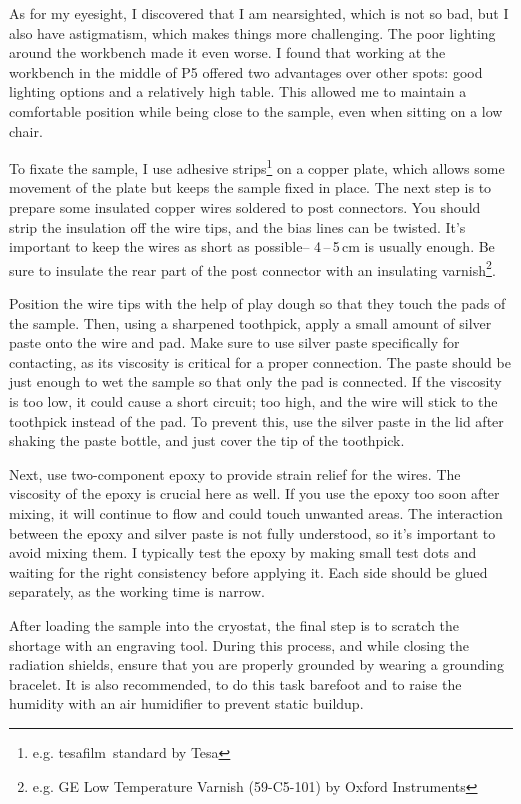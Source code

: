         As for my eyesight, I discovered that I am nearsighted, which is not so bad, but I also have astigmatism, which makes things more challenging. The poor lighting around the workbench made it even worse. I found that working at the workbench in the middle of P5 offered two advantages over other spots: good lighting options and a relatively high table. This allowed me to maintain a comfortable position while being close to the sample, even when sitting on a low chair.

        To fixate the sample, I use adhesive strips\footnote{e.g. tesafilm\textregistered\ standard by Tesa} on a copper plate, which allows some movement of the plate but keeps the sample fixed in place. The next step is to prepare some insulated copper wires soldered to post connectors. You should strip the insulation off the wire tips, and the bias lines can be twisted. It's important to keep the wires as short as possible-- 4\,--\,5\,cm is usually enough. Be sure to insulate the rear part of the post connector with an insulating varnish\footnote{e.g. GE Low Temperature Varnish (59-C5-101) by Oxford Instruments}.

        Position the wire tips with the help of play dough so that they touch the pads of the sample. Then, using a sharpened toothpick, apply a small amount of silver paste onto the wire and pad. Make sure to use silver paste specifically for contacting, as its viscosity is critical for a proper connection. The paste should be just enough to wet the sample so that only the pad is connected. If the viscosity is too low, it could cause a short circuit; too high, and the wire will stick to the toothpick instead of the pad. To prevent this, use the silver paste in the lid after shaking the paste bottle, and just cover the tip of the toothpick.

        Next, use two-component epoxy to provide strain relief for the wires. The viscosity of the epoxy is crucial here as well. If you use the epoxy too soon after mixing, it will continue to flow and could touch unwanted areas. The interaction between the epoxy and silver paste is not fully understood, so it's important to avoid mixing them. I typically test the epoxy by making small test dots and waiting for the right consistency before applying it. Each side should be glued separately, as the working time is narrow.
        
        After loading the sample into the cryostat, the final step is to scratch the shortage with an engraving tool. During this process, and while closing the radiation shields, ensure that you are properly grounded by wearing a grounding bracelet. It is also recommended, to do this task barefoot and to raise the humidity with an air humidifier to prevent static buildup.

